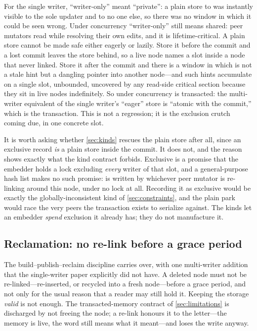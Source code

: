 \documentclass[11pt]{article}
\begin{document}
For the single writer, ``writer-only'' meant ``private'': a plain store to
 was instantly visible to the sole updater and to no one else, so
there was no window in which it could be seen wrong. Under concurrency
``writer-only'' still means shared: peer mutators read  while
resolving their own edits, and it is lifetime-critical. A plain store cannot be
made safe either eagerly or lazily. Store it before the commit and a lost commit
leaves the store behind, so a live node names a slot inside a node that never
linked. Store it after the commit and there is a window in which  is
not a stale hint but a dangling pointer into another node---and such hints
accumulate on a single slot, unbounded, uncovered by any read-side critical
section because they sit in live nodes indefinitely. So under concurrency
 is transacted: the multi-writer equivalent of the single writer's
``eager'' store is ``atomic with the commit,'' which is the transaction. This is
not a regression; it is the exclusion crutch coming due, in one concrete slot.

It is worth asking whether \cref{sec:kinds} rescues the plain store after all, since
an exclusive record \emph{is} a plain store inside the commit. It does not, and
the reason shows exactly what the kind contract forbids. Exclusive is a promise that the embedder
holds a lock excluding \emph{every} writer of that slot, and a general-purpose
hash list makes no such promise:  is written by whichever peer mutator
is re-linking around this node, under no lock at all. Recording it as exclusive
would be exactly the globally-inconsistent kind of \cref{sec:constraints}, and the
plain park would race the very peers the transaction exists to serialize against.
The kinds let an embedder \emph{spend} exclusion it already has; they do not
manufacture it.

\subsection{Reclamation: no re-link before a grace period}
\label{sec:reclaim}

The build--publish--reclaim discipline carries over, with one multi-writer
addition that the single-writer paper explicitly did not have. A deleted node
must not be re-linked---re-inserted, or recycled into a fresh node---before a
grace period, and not only for the usual reason that a reader may still hold it.
Keeping the storage \emph{valid} is not enough. The transacted-memory contract
of \cref{sec:limitations} is discharged by not freeing the node; a re-link
honours it to the letter---the memory is live, the word still means what it
meant---and loses the write anyway.
\end{document}
